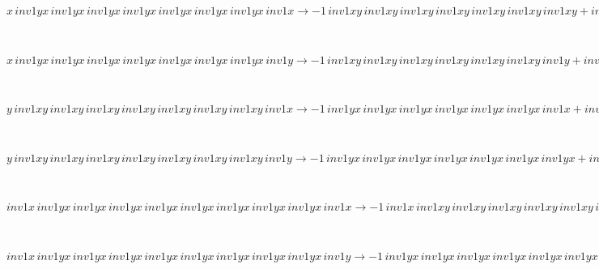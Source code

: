 \begin{minipage}{6in}
$
x\,
 inv1yx\,
 inv1yx\,
 inv1yx\,
 inv1yx\,
 inv1yx\,
 inv1yx\,
 inv1yx\,
 inv1x\rightarrow -1\,
 inv1xy\,
 inv1xy\,
 inv1xy\,
 inv1xy\,
 inv1xy\,
 inv1xy\,
 inv1xy + inv1xy\,
 inv1xy\,
 inv1xy\,
 inv1xy\,
 inv1xy\,
 inv1xy\,
 inv1xy\,
 inv1x
$
\end{minipage}\medskip \\
\begin{minipage}{6in}
$
x\,
 inv1yx\,
 inv1yx\,
 inv1yx\,
 inv1yx\,
 inv1yx\,
 inv1yx\,
 inv1yx\,
 inv1y\rightarrow -1\,
 inv1xy\,
 inv1xy\,
 inv1xy\,
 inv1xy\,
 inv1xy\,
 inv1xy\,
 inv1y + inv1xy\,
 inv1xy\,
 inv1xy\,
 inv1xy\,
 inv1xy\,
 inv1xy\,
 inv1xy\,
 inv1y + x\,
 inv1yx\,
 inv1yx\,
 inv1yx\,
 inv1yx\,
 inv1yx\,
 inv1yx\,
 inv1yx
$
\end{minipage}\medskip \\
\begin{minipage}{6in}
$
y\,
 inv1xy\,
 inv1xy\,
 inv1xy\,
 inv1xy\,
 inv1xy\,
 inv1xy\,
 inv1xy\,
 inv1x\rightarrow -1\,
 inv1yx\,
 inv1yx\,
 inv1yx\,
 inv1yx\,
 inv1yx\,
 inv1yx\,
 inv1x + inv1yx\,
 inv1yx\,
 inv1yx\,
 inv1yx\,
 inv1yx\,
 inv1yx\,
 inv1yx\,
 inv1x + y\,
 inv1xy\,
 inv1xy\,
 inv1xy\,
 inv1xy\,
 inv1xy\,
 inv1xy\,
 inv1xy
$
\end{minipage}\medskip \\
\begin{minipage}{6in}
$
y\,
 inv1xy\,
 inv1xy\,
 inv1xy\,
 inv1xy\,
 inv1xy\,
 inv1xy\,
 inv1xy\,
 inv1y\rightarrow -1\,
 inv1yx\,
 inv1yx\,
 inv1yx\,
 inv1yx\,
 inv1yx\,
 inv1yx\,
 inv1yx + inv1yx\,
 inv1yx\,
 inv1yx\,
 inv1yx\,
 inv1yx\,
 inv1yx\,
 inv1yx\,
 inv1y
$
\end{minipage}\medskip \\
\begin{minipage}{6in}
$
inv1x\,
 inv1yx\,
 inv1yx\,
 inv1yx\,
 inv1yx\,
 inv1yx\,
 inv1yx\,
 inv1yx\,
 inv1yx\,
 inv1x\rightarrow -1\,
 inv1x\,
 inv1xy\,
 inv1xy\,
 inv1xy\,
 inv1xy\,
 inv1xy\,
 inv1xy\,
 inv1xy\,
 inv1xy + inv1yx\,
 inv1yx\,
 inv1yx\,
 inv1yx\,
 inv1yx\,
 inv1yx\,
 inv1yx\,
 inv1yx\,
 inv1x + inv1x\,
 inv1xy\,
 inv1xy\,
 inv1xy\,
 inv1xy\,
 inv1xy\,
 inv1xy\,
 inv1xy\,
 inv1xy\,
 inv1x
$
\end{minipage}\medskip \\
\begin{minipage}{6in}
$
inv1x\,
 inv1yx\,
 inv1yx\,
 inv1yx\,
 inv1yx\,
 inv1yx\,
 inv1yx\,
 inv1yx\,
 inv1yx\,
 inv1y\rightarrow -1\,
 inv1yx\,
 inv1yx\,
 inv1yx\,
 inv1yx\,
 inv1yx\,
 inv1yx\,
 inv1yx\,
 inv1yx - inv1x\,
 inv1xy\,
 inv1xy\,
 inv1xy\,
 inv1xy\,
 inv1xy\,
 inv1xy\,
 inv1xy\,
 inv1y + inv1x\,
 inv1yx\,
 inv1yx\,
 inv1yx\,
 inv1yx\,
 inv1yx\,
 inv1yx\,
 inv1yx\,
 inv1yx + inv1yx\,
 inv1yx\,
 inv1yx\,
 inv1yx\,
 inv1yx\,
 inv1yx\,
 inv1yx\,
 inv1yx\,
 inv1y + inv1x\,
 inv1xy\,
 inv1xy\,
 inv1xy\,
 inv1xy\,
 inv1xy\,
 inv1xy\,
 inv1xy\,
 inv1xy\,
 inv1y
$
\end{minipage}\medskip \\
